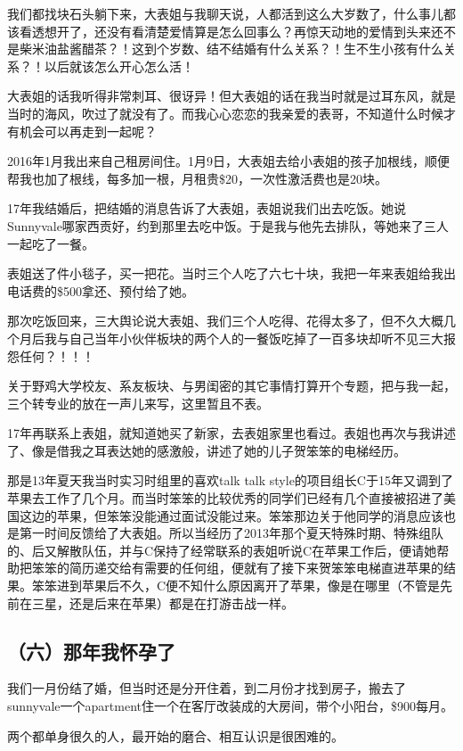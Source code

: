 \documentclass[9pt, b5paper]{article}
\begin{document}
我们都找块石头躺下来，大表姐与我聊天说，人都活到这么大岁数了，什么事儿都该看透想开了，还没有看清楚爱情算是怎么回事么？再惊天动地的爱情到头来还不是柴米油盐酱醋茶？！这到个岁数、结不结婚有什么关系？！生不生小孩有什么关系？！以后就该怎么开心怎么活！

大表姐的话我听得非常刺耳、很讶异！但大表姐的话在我当时就是过耳东风，就是当时的海风，吹过了就没有了。而我心心恋恋的我亲爱的表哥，不知道什么时候才有机会可以再走到一起呢？

2016年1月我出来自己租房间住。1月9日，大表姐去给小表姐的孩子加根线，顺便帮我也加了根线，每多加一根，月租贵\$20，一次性激活费也是20块。 

17年我结婚后，把结婚的消息告诉了大表姐，表姐说我们出去吃饭。她说Sunnyvale哪家西贡好，约到那里去吃中饭。于是我与他先去排队，等她来了三人一起吃了一餐。

表姐送了件小毯子，买一把花。当时三个人吃了六七十块，我把一年来表姐给我出电话费的\$500拿还、预付给了她。

那次吃饭回来，三大舆论说大表姐、我们三个人吃得、花得太多了，但不久大概几个月后我与自己当年小伙伴板块的两个人的一餐饭吃掉了一百多块却听不见三大报怨任何？！！！

关于野鸡大学校友、系友板块、与男闺密的其它事情打算开个专题，把与我一起，三个转专业的放在一声儿来写，这里暂且不表。 

17年再联系上表姐，就知道她买了新家，去表姐家里也看过。表姐也再次与我讲述了、像是借我之耳表达她的感激般，讲述了她的儿子贺笨笨的电梯经历。

那是13年夏天我当时实习时组里的喜欢talk talk style的项目组长C于15年又调到了苹果去工作了几个月。而当时笨笨的比较优秀的同学们已经有几个直接被招进了美国这边的苹果，但笨笨没能通过面试没能过来。笨笨那边关于他同学的消息应该也是第一时间反馈给了大表姐。所以当经历了2013年那个夏天特殊时期、特殊组队的、后又解散队伍，并与C保持了经常联系的表姐听说C在苹果工作后，便请她帮助把笨笨的简历递交给有需要的任何组，便就有了接下来贺笨笨电梯直进苹果的结果。笨笨进到苹果后不久，C便不知什么原因离开了苹果，像是在哪里（不管是先前在三星，还是后来在苹果）都是在打游击战一样。 

\subsection{（六）那年我怀孕了}
\label{sec:orgc9c5b0c}

我们一月份结了婚，但当时还是分开住着，到二月份才找到房子，搬去了sunnyvale一个apartment住一个在客厅改装成的大房间，带个小阳台，\$900每月。

两个都单身很久的人，最开始的磨合、相互认识是很困难的。
\end{document}
